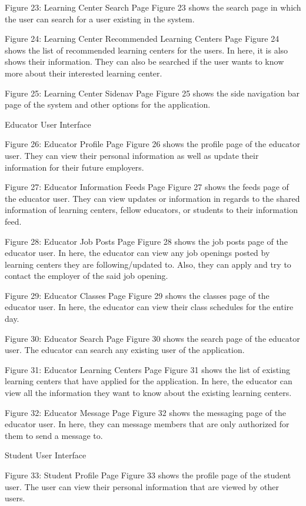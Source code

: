 Figure 23: Learning Center Search Page
Figure 23 shows the search page in which the user can search for a user existing in the system.  
 
Figure 24: Learning Center Recommended Learning Centers Page
Figure 24 shows the list of recommended learning centers for the users. In here, it is also shows their information. They can also be searched if the user wants to know more about their interested learning center. 
 
Figure 25: Learning Center Sidenav Page 
Figure 25 shows the side navigation bar page of the system and other options for the application.


Educator User Interface
 
Figure 26: Educator Profile Page
Figure 26 shows the profile page of the educator user. They can view their personal information as well as update their information for their future employers. 

 
Figure 27: Educator Information Feeds Page
Figure 27 shows the feeds page of the educator user. They can view updates or information in regards to the shared information of learning centers, fellow educators, or students to their information feed. 
     
Figure 28: Educator Job Posts Page
Figure 28 shows the job posts page of the educator user. In here, the educator can view any job openings posted by learning centers they are following/updated to. Also, they can apply and try to contact the employer of the said job opening.
 
Figure 29: Educator Classes Page
Figure 29 shows the classes page of the educator user. In here, the educator can view their class schedules for the entire day. 
 
Figure 30: Educator Search Page
Figure 30 shows the search page of the educator user. The educator can search any existing user of the application. 
 
Figure 31: Educator Learning Centers Page
Figure 31 shows the list of existing learning centers that have applied for the application. In here, the educator can view all the information they want to know about the existing learning centers.
 
Figure 32: Educator Message Page
Figure 32 shows the messaging page of the educator user. In here, they can message members that are only authorized for them to send a message to.  

Student User Interface
  
Figure 33: Student Profile Page
Figure 33 shows the profile page of the student user. The user can view their personal information that are viewed by other users.   
 
